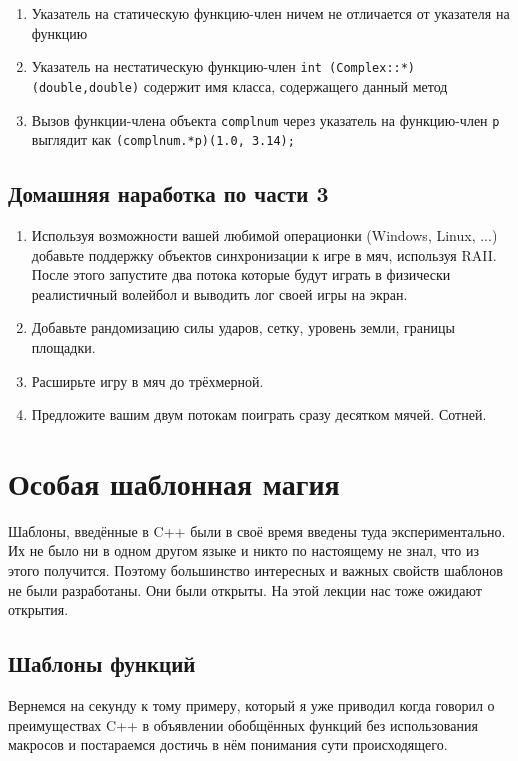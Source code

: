 \documentclass[a4paper,12pt,oneside]{article}
\begin{document}
\begin{enumerate}
\item
Указатель на статическую функцию-член ничем не отличается от указателя на функцию
\item
Указатель на нестатическую функцию-член \lstinline!int (Complex::*)(double,double)! содержит имя класса, содержащего данный метод
\item
Вызов функции-члена объекта \lstinline!complnum! через указатель на функцию-член \lstinline!p! выглядит как \lstinline!(complnum.*p)(1.0, 3.14);!
\end{enumerate}

\subsection{Домашняя наработка по части 3}

\begin{enumerate}
\item
Используя возможности вашей любимой операционки (Windows, Linux, ...) добавьте поддержку объектов синхронизации к игре в мяч, используя RAII. После этого запустите два потока которые будут играть в физически реалистичный волейбол и выводить лог своей игры на экран. 
\item
Добавьте рандомизацию силы ударов, сетку, уровень земли, границы площадки. 
\item
Расширьте игру в мяч до трёхмерной. 
\item
Предложите вашим двум потокам поиграть сразу десятком мячей. Сотней.
\end{enumerate}

\pagebreak
\section{Особая шаблонная магия}

Шаблоны, введённые в C++ были в своё время введены туда экспериментально. Их не было ни в одном другом языке и никто по настоящему не знал, что из этого получится. Поэтому большинство интересных и важных свойств шаблонов не были разработаны. Они были открыты. На этой лекции нас тоже ожидают открытия.

\subsection{Шаблоны функций}

Вернемся на секунду к тому примеру, который я уже приводил когда говорил о преимуществах C++ в объявлении обобщённых функций без использования макросов и постараемся достичь в нём понимания сути происходящего.
\end{document}
